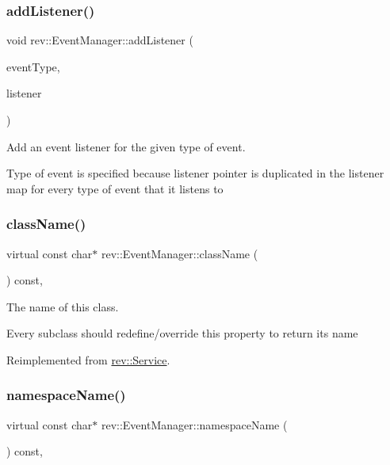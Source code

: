 \subsubsection{\texorpdfstring{addListener()}{addListener()}}
{\footnotesize\ttfamily void rev\+::\+Event\+Manager\+::add\+Listener (\begin{DoxyParamCaption}\item[{int}]{event\+Type,  }\item[{\mbox{\hyperlink{classrev_1_1_event_listener}{Event\+Listener}} $\ast$}]{listener }\end{DoxyParamCaption})}



Add an event listener for the given type of event. 

Type of event is specified because listener pointer is duplicated in the listener map for every type of event that it listens to \mbox{\label{classrev_1_1_event_manager_a3999d64126b1b5e0d8d4a47636bfe4c5}} 
\subsubsection{\texorpdfstring{className()}{className()}}
{\footnotesize\ttfamily virtual const char$\ast$ rev\+::\+Event\+Manager\+::class\+Name (\begin{DoxyParamCaption}{ }\end{DoxyParamCaption}) const\hspace{0.3cm}{\ttfamily [inline]}, {\ttfamily [virtual]}}



The name of this class. 

Every subclass should redefine/override this property to return its name 

Reimplemented from \mbox{\hyperlink{classrev_1_1_service_a484d71757ea6e8780488602cb421a4a5}{rev\+::\+Service}}.

\mbox{\label{classrev_1_1_event_manager_a5188a25a9b785d841c39aefafd5f391e}} 
\subsubsection{\texorpdfstring{namespaceName()}{namespaceName()}}
{\footnotesize\ttfamily virtual const char$\ast$ rev\+::\+Event\+Manager\+::namespace\+Name (\begin{DoxyParamCaption}{ }\end{DoxyParamCaption}) const\hspace{0.3cm}{\ttfamily [inline]}, {\ttfamily [virtual]}}



